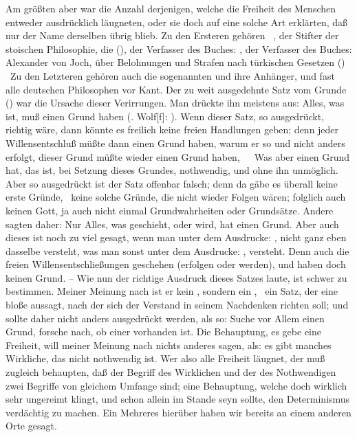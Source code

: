 \begin{aufza}
\item Am größten aber war die Anzahl derjenigen, welche die Freiheit des Menschen entweder ausdrücklich läugneten, oder sie doch auf eine solche Art erklärten, daß nur der Name derselben übrig blieb. Zu den Ersteren gehören \zB\ , der Stifter der stoischen Philosophie, die  (), der Verfasser des Buches:  , der Verfasser des Buches: Alexander von Joch, über Belohnungen und Strafen nach türkischen Gesetzen () \uA\ Zu den Letzteren gehören auch die sogenannten  und ihre Anhänger,  und fast alle deutschen Philosophen vor Kant. Der zu weit ausgedehnte Satz vom Grunde () war die Ursache dieser Verirrungen. Man drückte ihn meistens aus: Alles, was ist, muß einen Grund haben (. Wolf[f]: ). Wenn dieser Satz, so ausgedrückt, richtig wäre, dann könnte es freilich keine freien Handlungen geben; denn jeder Willensentschluß müßte dann einen Grund haben, warum er so und nicht anders erfolgt, dieser Grund müßte wieder einen Grund haben,~\ \usf\ Was aber einen Grund hat, das ist, bei Setzung dieses Grundes, nothwendig, und ohne ihn unmöglich. Aber so ausgedrückt ist der Satz offenbar falsch; denn da gäbe es überall keine erste Gründe, \dh\ keine solche Gründe, die nicht wieder Folgen wären; folglich auch keinen Gott, ja auch nicht einmal Grundwahrheiten oder Grundsätze. Andere sagten daher: Nur Alles, was geschieht, oder wird, hat einen Grund. Aber auch dieses ist noch zu viel gesagt, wenn man unter dem Ausdrucke: , nicht ganz eben dasselbe versteht, was man sonst unter dem Ausdrucke: , versteht. Denn auch die freien Willensentschließungen geschehen (erfolgen oder werden), und haben doch keinen Grund. -- Wie nun der richtige Ausdruck dieses Satzes laute, ist schwer zu bestimmen. Meiner Meinung nach ist er kein , sondern ein , \dh\ ein Satz, der eine bloße  aussagt, nach der sich der Verstand in seinem Nachdenken richten soll; und sollte daher nicht anders ausgedrückt werden, als so: Suche vor Allem einen Grund, forsche nach, ob einer vorhanden ist. Die Behauptung, es gebe eine Freiheit, will meiner Meinung nach nichts anderes sagen, als: es gibt manches Wirkliche, das nicht nothwendig ist. Wer also alle Freiheit läugnet, der muß zugleich behaupten, daß der Begriff des Wirklichen und der des Nothwendigen zwei Begriffe von gleichem Umfange sind; eine Behauptung, welche doch wirklich sehr ungereimt klingt, und schon allein im Stande seyn sollte, den Determinismus verdächtig zu machen. Ein Mehreres hierüber haben wir bereits an einem anderen Orte gesagt.

\end{aufza}
